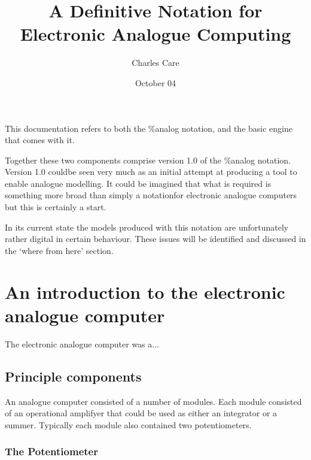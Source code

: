 \documentclass[a4paper,12pt]{article}
\title{A Definitive Notation for Electronic Analogue Computing}
\date{October 04}
\author{Charles Care}
\begin{document}
\maketitle


This documentation refers to both the \%analog 
notation, and the basic engine that comes with it.

Together these two components comprise version 1.0 of the \%analog notation. Version 1.0 couldbe seen very much as an initial attempt at producing a tool to enable analogue modelling. It could be imagined that what is required is something more broad than simply a notationfor electronic analogue computers but this is certainly a start.

In its current state the models produced with this notation are unfortunately rather digital in certain behaviour. These issues will be identified and discussed in the `where from here' section.

\section{An introduction to the electronic analogue computer}

The electronic analogue computer was a...

\subsection{Principle components}
An analogue computer consisted of a number of modules. Each module consisted of an operational amplifyer that could be used as either an integrator or a summer. Typically each module also contained two potentiometers.

\subsubsection{The Potentiometer}
\end{document}
